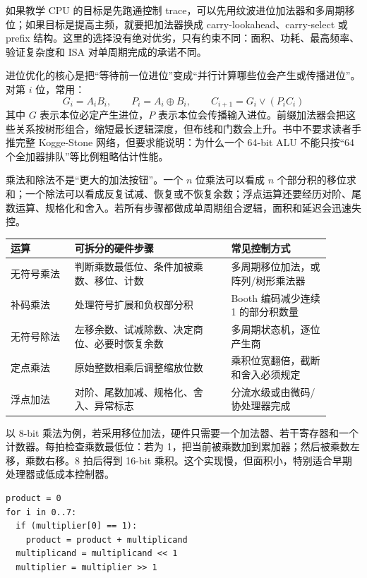 如果教学 CPU 的目标是先跑通控制 trace，可以先用纹波进位加法器和多周期移位；如果目标是提高主频，就要把加法器换成 carry-lookahead、carry-select 或 prefix 结构。这里的选择没有绝对优劣，只有约束不同：面积、功耗、最高频率、验证复杂度和 ISA 对单周期完成的承诺不同。

进位优化的核心是把“等待前一位进位”变成“并行计算哪些位会产生或传播进位”。对第 \(i\) 位，常用：
\[
G_i=A_iB_i,\qquad P_i=A_i\oplus B_i,\qquad C_{i+1}=G_i\lor(P_iC_i)
\]
其中 \(G\) 表示本位必定产生进位，\(P\) 表示本位会传播输入进位。前缀加法器会把这些关系按树形组合，缩短最长逻辑深度，但布线和门数会上升。书中不要求读者手推完整 Kogge-Stone 网络，但要求能说明：为什么一个 64-bit ALU 不能只按“64 个全加器排队”等比例粗略估计性能。

乘法和除法不是“更大的加法按钮”。一个 \(n\) 位乘法可以看成 \(n\) 个部分积的移位求和；一个除法可以看成反复试减、恢复或不恢复余数；浮点运算还要经历对阶、尾数运算、规格化和舍入。若所有步骤都做成单周期组合逻辑，面积和延迟会迅速失控。

\begin{longtable}{L{0.18\linewidth}L{0.44\linewidth}L{0.28\linewidth}}
\toprule
运算 & 可拆分的硬件步骤 & 常见控制方式 \\
\midrule
无符号乘法 & 判断乘数最低位、条件加被乘数、移位、计数 & 多周期移位加法，或阵列/树形乘法器 \\
补码乘法 & 处理符号扩展和负权部分积 & Booth 编码减少连续 1 的部分积数量 \\
无符号除法 & 左移余数、试减除数、决定商位、必要时恢复余数 & 多周期状态机，逐位产生商 \\
定点乘法 & 原始整数相乘后调整缩放位数 & 乘积位宽翻倍，截断和舍入必须规定 \\
浮点加法 & 对阶、尾数加减、规格化、舍入、异常标志 & 分流水级或由微码/协处理器完成 \\
\bottomrule
\end{longtable}

以 8-bit 乘法为例，若采用移位加法，硬件只需要一个加法器、若干寄存器和一个计数器。每拍检查乘数最低位：若为 1，把当前被乘数加到累加器；然后被乘数左移，乘数右移。8 拍后得到 16-bit 乘积。这个实现慢，但面积小，特别适合早期处理器或低成本控制器。

\begin{lstlisting}
product = 0
for i in 0..7:
  if (multiplier[0] == 1):
    product = product + multiplicand
  multiplicand = multiplicand << 1
  multiplier = multiplier >> 1
\end{lstlisting}

